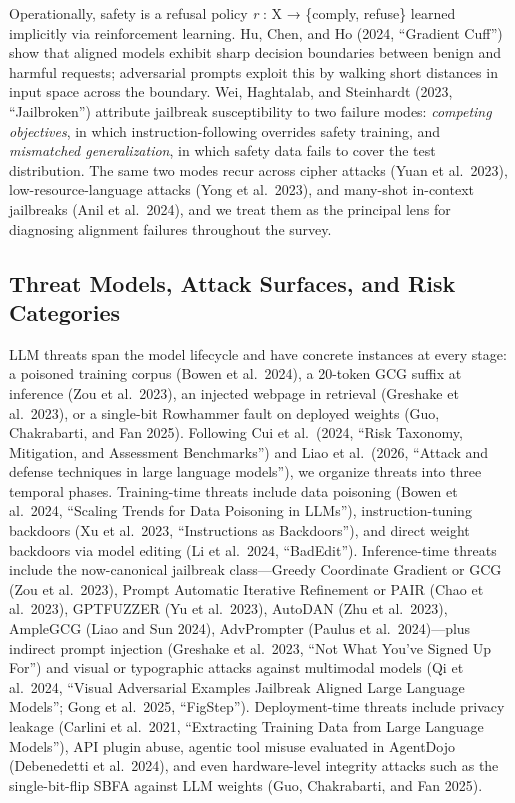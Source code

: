 Operationally, safety is a refusal policy \emph{r} : X → \{comply, refuse\} learned implicitly via reinforcement learning. Hu, Chen, and Ho (2024, ``Gradient Cuff'') show that aligned models exhibit sharp decision boundaries between benign and harmful requests; adversarial prompts exploit this by walking short distances in input space across the boundary. Wei, Haghtalab, and Steinhardt (2023, ``Jailbroken'') attribute jailbreak susceptibility to two failure modes: \emph{competing objectives}, in which instruction-following overrides safety training, and \emph{mismatched generalization}, in which safety data fails to cover the test distribution. The same two modes recur across cipher attacks (Yuan et al.~2023), low-resource-language attacks (Yong et al.~2023), and many-shot in-context jailbreaks (Anil et al.~2024), and we treat them as the principal lens for diagnosing alignment failures throughout the survey.

\subsection{Threat Models, Attack Surfaces, and Risk Categories}\label{threat-models-attack-surfaces-and-risk-categories}

LLM threats span the model lifecycle and have concrete instances at every stage: a poisoned training corpus (Bowen et al.~2024), a 20-token GCG suffix at inference (Zou et al.~2023), an injected webpage in retrieval (Greshake et al.~2023), or a single-bit Rowhammer fault on deployed weights (Guo, Chakrabarti, and Fan 2025). Following Cui et al.~(2024, ``Risk Taxonomy, Mitigation, and Assessment Benchmarks'') and Liao et al.~(2026, ``Attack and defense techniques in large language models''), we organize threats into three temporal phases. Training-time threats include data poisoning (Bowen et al.~2024, ``Scaling Trends for Data Poisoning in LLMs''), instruction-tuning backdoors (Xu et al.~2023, ``Instructions as Backdoors''), and direct weight backdoors via model editing (Li et al.~2024, ``BadEdit''). Inference-time threats include the now-canonical jailbreak class---Greedy Coordinate Gradient or GCG (Zou et al.~2023), Prompt Automatic Iterative Refinement or PAIR (Chao et al.~2023), GPTFUZZER (Yu et al.~2023), AutoDAN (Zhu et al.~2023), AmpleGCG (Liao and Sun 2024), AdvPrompter (Paulus et al.~2024)---plus indirect prompt injection (Greshake et al.~2023, ``Not What You've Signed Up For'') and visual or typographic attacks against multimodal models (Qi et al.~2024, ``Visual Adversarial Examples Jailbreak Aligned Large Language Models''; Gong et al.~2025, ``FigStep''). Deployment-time threats include privacy leakage (Carlini et al.~2021, ``Extracting Training Data from Large Language Models''), API plugin abuse, agentic tool misuse evaluated in AgentDojo (Debenedetti et al.~2024), and even hardware-level integrity attacks such as the single-bit-flip SBFA against LLM weights (Guo, Chakrabarti, and Fan 2025).

